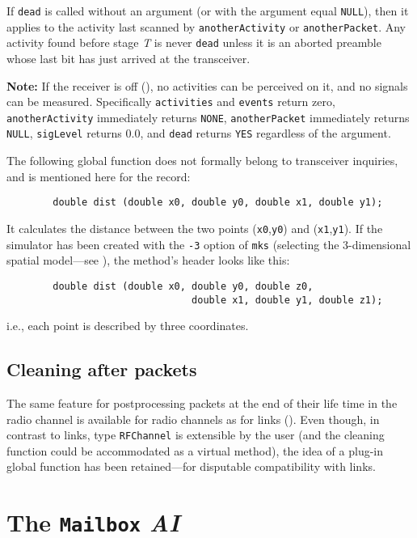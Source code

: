 If {\tt dead} is called without an argument (or with the argument
equal {\tt NULL}), then it applies to the activity last scanned by
{\tt anotherActivity} or {\tt anotherPacket}.
Any activity found before stage {\em T\/} is never {\tt dead} unless it
is an aborted preamble whose last bit has just arrived at the
transceiver.

\noindent
{\bf Note:}
If the receiver is off (), no activities can be perceived
on it, and no signals can be measured.
Specifically {\tt activities} and {\tt events} return zero,
{\tt anotherActivity} immediately returns {\tt NONE},
{\tt anotherPacket} immediately returns {\tt NULL}, {\tt sigLevel} returns
$0.0$, and {\tt dead} returns {\tt YES} regardless of the argument.

\medskip

The following global function does not formally belong to transceiver
inquiries, and is mentioned here for the record:
\begin{verbatim}
        double dist (double x0, double y0, double x1, double y1);
\end{verbatim}
\noindent
It calculates the distance between the two points ({\tt x0},{\tt y0})
and ({\tt x1},{\tt y1}).
If the simulator has been created with the {\tt -3} option of {\tt mks}
(selecting the 3-dimensional spatial model---see ),
the method's header looks like this:
\begin{verbatim}
        double dist (double x0, double y0, double z0,
                                double x1, double y1, double z1);
\end{verbatim}
\noindent
i.e., each point is described by three coordinates.

\subsection{Cleaning after packets}
\label{rm_tr_cl}

The same feature for postprocessing packets at the end of their life time in
the radio channel is available for radio channels as for links
().
Even though, in contrast to links, type {\tt RFChannel} is extensible by the
user (and the cleaning function could be accommodated as a virtual
method), the idea of a plug-in global function has been retained---for
disputable compatibility with links.

\section{The {\tt Mailbox} {\em AI}}
\label{rm_mb}

